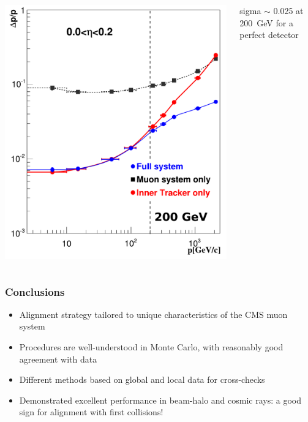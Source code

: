 \documentclass[compress]{beamer}
\begin{document}
\begin{frame}
\begin{columns}
\vspace{0.2 cm}
\includegraphics[width=\linewidth]{Figure_001-005-a.pdf}

sigma $\sim$ 0.025 at 200~GeV for a perfect detector
\end{columns}
\end{frame}


\begin{frame}
\frametitle{Conclusions}

\begin{itemize}\setlength{\itemsep}{0.5 cm}
\item Alignment strategy tailored to unique characteristics of the CMS muon system
\item Procedures are well-understood in Monte Carlo, with reasonably good agreement with data
\item Different methods based on global and local data for cross-checks
\item Demonstrated excellent performance in beam-halo and cosmic rays: a good sign for alignment with first collisions!
\end{itemize}

\label{numpages}
\end{frame}
\end{document}
